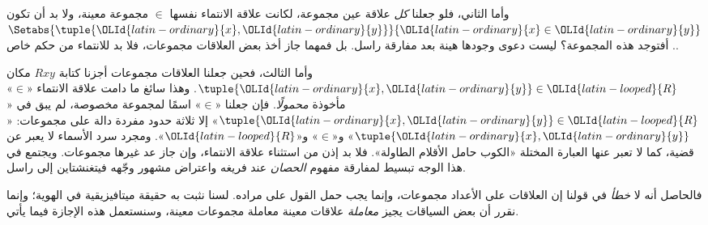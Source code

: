 \documentclass[../../../include/open-logic-section]{subfiles}
\begin{document}
وأما الثاني، فلو جعلنا \emph{كل} علاقة عين مجموعة، لكانت علاقة
الانتماء نفسها $ \in$ مجموعة معينة، ولا بد أن تكون
$\Setabs{\tuple{\OLId{latin-ordinary}{x},\OLId{latin-ordinary}{y}}}{\OLId{latin-ordinary}{x} \in \OLId{latin-ordinary}{y}}$. أفتوجد هذه المجموعة؟ ليست دعوى
وجودها هينة بعد مفارقة راسل. بل
فمهما جاز أخذ بعض العلاقات مجموعات، فلا بد للانتماء من حكم خاص.

وأما الثالث، فحين جعلنا العلاقات مجموعات أجزنا كتابة $Rxy$ مكان
$\tuple{\OLId{latin-ordinary}{x},\OLId{latin-ordinary}{y}} \in \OLId{latin-looped}{R}$. وهذا سائغ ما دامت علاقة الانتماء «$\in$»
مأخوذة \emph{محمولًا}. فإن جعلنا «$\in$» اسمًا لمجموعة مخصوصة، لم
يبق في «$\tuple{\OLId{latin-ordinary}{x},\OLId{latin-ordinary}{y}} \in \OLId{latin-looped}{R}$» إلا ثلاثة حدود مفردة دالة على مجموعات:
«$\tuple{\OLId{latin-ordinary}{x},\OLId{latin-ordinary}{y}}$» و«$\in$» و«$\OLId{latin-looped}{R}$». ومجرد سرد الأسماء لا يعبر عن قضية،
كما لا تعبر عنها العبارة المختلة «الكوب حامل الأقلام الطاولة».
فلا بد إذن من استثناء علاقة الانتماء، وإن جاز عد غيرها مجموعات.
ويجتمع في هذا الوجه تبسيط لمفارقة مفهوم \emph{الحصان} عند فريغه
واعتراض مشهور وجّهه فيتغنشتاين إلى راسل.

فالحاصل أنه لا \emph{خطأ} في قولنا إن العلاقات على الأعداد مجموعات،
وإنما يجب حمل القول على مراده. لسنا نثبت به حقيقة ميتافيزيقية في
الهوية؛ وإنما نقرر أن بعض السياقات يجيز \emph{معاملة} علاقات معينة
معاملة مجموعات معينة، وسنستعمل هذه الإجازة فيما يأتي.
\end{document}
